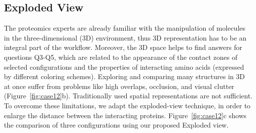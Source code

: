 \documentclass{bmcart}
\def\ExpView {Exploded view\xspace}
\def\MatView {Matrix view\xspace}
\begin{document}









\subsection*{Exploded View}
The proteomics experts are already familiar with the manipulation of molecules in the three-dimensional (3D) environment, thus 3D representation has to be an integral part of the workflow.
Moreover, the 3D space helps to find answers for questions Q3-Q5, which are related to the appearance of the contact zones of selected configurations and the properties of interacting amino acids (expressed by different coloring schemes).
Exploring and comparing many structures in 3D at once suffer from problems like high overlaps, occlusion, and visual clutter (Figure~\ref{fig:case12}b). 
Traditionally used spatial representations are not sufficient.
To overcome these limitations, we adapt the exploded-view technique, in order to enlarge the distance between the interacting proteins. 
Figure~\ref{fig:case12}c shows the comparison of three configurations using our proposed \ExpView.
\end{document}
